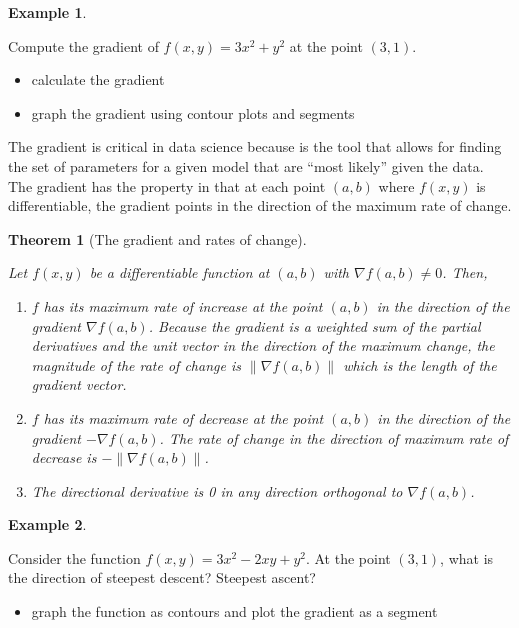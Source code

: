 \documentclass[
]{book}
\providecommand{\tightlist}{%
  \setlength{\itemsep}{0pt}\setlength{\parskip}{0pt}}
\newtheorem{theorem}{Theorem}[chapter]
\theoremstyle{definition}
\theoremstyle{definition}
\newtheorem{example}{Example}[chapter]
\theoremstyle{definition}
\theoremstyle{remark}
\begin{document}
\begin{example}
\protect\hypertarget{exm:unlabeled-div-219}{}\label{exm:unlabeled-div-219}

Compute the gradient of \(f(x, y) = 3x^2 + y^2\) at the point \((3, 1)\).

\begin{itemize}
\tightlist
\item
  calculate the gradient
\item
  graph the gradient using contour plots and segments
\end{itemize}

\end{example}

The gradient is critical in data science because is the tool that allows for finding the set of parameters for a given model that are ``most likely'' given the data. The gradient has the property in that at each point \((a, b)\) where \(f(x, y)\) is differentiable, the gradient points in the direction of the maximum rate of change.

\begin{theorem}[The gradient and rates of change]
\protect\hypertarget{thm:gradient}{}\label{thm:gradient}

Let \(f(x, y)\) be a differentiable function at \((a, b)\) with \(\nabla f(a, b) \neq 0\). Then,

\begin{enumerate}
\def\labelenumi{\arabic{enumi})}
\item
  \(f\) has its maximum rate of increase at the point \((a, b)\) in the direction of the gradient \(\nabla f(a, b)\). Because the gradient is a weighted sum of the partial derivatives and the unit vector in the direction of the maximum change, the magnitude of the rate of change is \(\|\nabla f(a, b)\|\) which is the length of the gradient vector.
\item
  \(f\) has its maximum rate of decrease at the point \((a, b)\) in the direction of the gradient \(-\nabla f(a, b)\). The rate of change in the direction of maximum rate of decrease is \(-\|\nabla f(a, b)\|\).
\item
  The directional derivative is 0 in any direction orthogonal to \(\nabla f(a, b)\).
\end{enumerate}

\end{theorem}

\begin{example}
\protect\hypertarget{exm:unlabeled-div-220}{}\label{exm:unlabeled-div-220}

Consider the function \(f(x, y) = 3x^2 - 2xy + y^2\). At the point \((3, 1)\), what is the direction of steepest descent? Steepest ascent?

\begin{itemize}
\tightlist
\item
  graph the function as contours and plot the gradient as a segment
\end{itemize}

\end{example}
\end{document}
